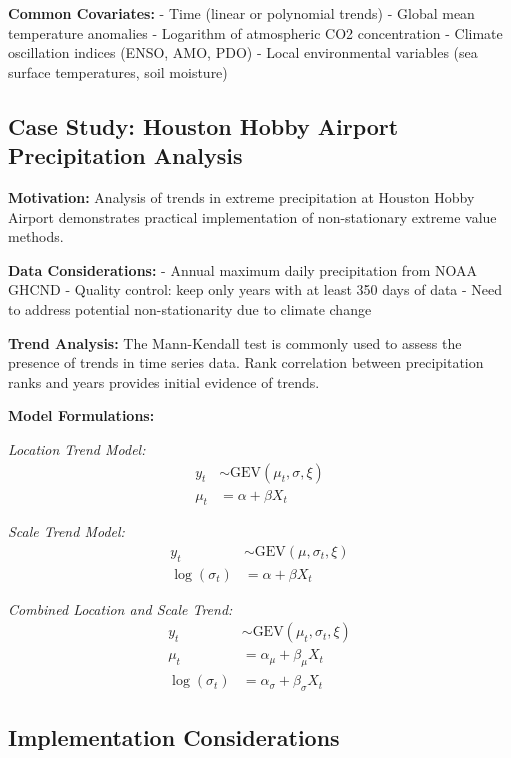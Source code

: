\documentclass[
  letterpaper,
  DIV=11,
  numbers=noendperiod]{scrreprt}
\begin{document}
\textbf{Common Covariates:} - Time (linear or polynomial trends) -
Global mean temperature anomalies - Logarithm of atmospheric CO2
concentration - Climate oscillation indices (ENSO, AMO, PDO) - Local
environmental variables (sea surface temperatures, soil moisture)

\subsection{Case Study: Houston Hobby Airport Precipitation
Analysis}\label{case-study-houston-hobby-airport-precipitation-analysis}

\textbf{Motivation:} Analysis of trends in extreme precipitation at
Houston Hobby Airport demonstrates practical implementation of
non-stationary extreme value methods.

\textbf{Data Considerations:} - Annual maximum daily precipitation from
NOAA GHCND - Quality control: keep only years with at least 350 days of
data - Need to address potential non-stationarity due to climate change

\textbf{Trend Analysis:} The Mann-Kendall test is commonly used to
assess the presence of trends in time series data. Rank correlation
between precipitation ranks and years provides initial evidence of
trends.

\textbf{Model Formulations:}

\emph{Location Trend Model:} \[
\begin{aligned}
y_t &\sim \text{GEV} \left( \mu_t, \sigma, \xi \right) \\
\mu_t &= \alpha + \beta X_t
\end{aligned}
\]

\emph{Scale Trend Model:} \[
\begin{aligned}
y_t &\sim \text{GEV} \left( \mu, \sigma_t, \xi \right) \\
\log(\sigma_t) &= \alpha + \beta X_t
\end{aligned}
\]

\emph{Combined Location and Scale Trend:} \[
\begin{aligned}
y_t &\sim \text{GEV} \left( \mu_t, \sigma_t, \xi \right) \\
\mu_t &= \alpha_\mu + \beta_\mu X_t \\
\log(\sigma_t) &= \alpha_\sigma + \beta_\sigma X_t
\end{aligned}
\]

\subsection{Implementation
Considerations}\label{implementation-considerations}
\end{document}
